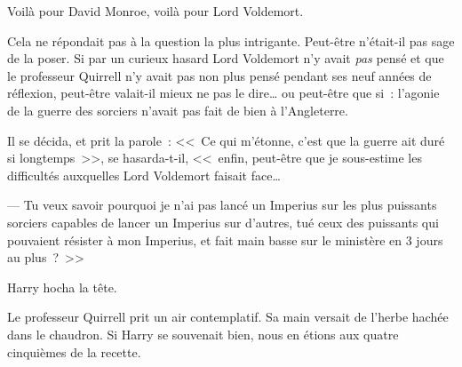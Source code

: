 Voilà pour David Monroe, voilà pour Lord Voldemort.

Cela ne répondait pas à la question la plus intrigante. Peut-être n'était-il pas sage de la poser. Si par un curieux hasard Lord Voldemort n'y avait \emph{pas} pensé et que le professeur Quirrell n'y avait pas non plus pensé pendant ses neuf années de réflexion, peut-être valait-il mieux ne pas le dire… ou peut-être que si~: l'agonie de la guerre des sorciers n'avait pas fait de bien à l'Angleterre.

Il se décida, et prit la parole~: <<~Ce qui m'étonne, c'est que la guerre ait duré si longtemps~>>, se hasarda-t-il, <<~enfin, peut-être que je sous-estime les difficultés auxquelles Lord Voldemort faisait face…

--- Tu veux savoir pourquoi je n'ai pas lancé un Imperius sur les plus puissants sorciers capables de lancer un Imperius sur d'autres, tué ceux des puissants qui pouvaient résister à mon Imperius, et fait main basse sur le ministère en 3 jours au plus~?~>>

Harry hocha la tête.

Le professeur Quirrell prit un air contemplatif. Sa main versait de l'herbe hachée dans le chaudron. Si Harry se souvenait bien, nous en étions aux quatre cinquièmes de la recette.

